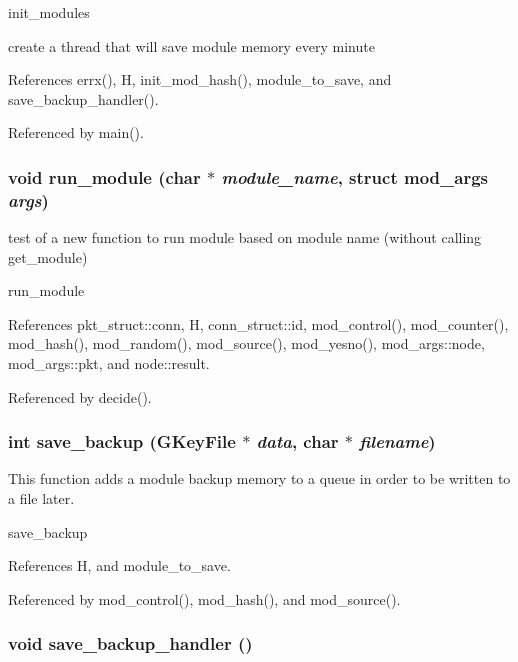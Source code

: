 init\_\-modules 

create a thread that will save module memory every minute 

References errx(), H, init\_\-mod\_\-hash(), module\_\-to\_\-save, and save\_\-backup\_\-handler().

Referenced by main().
\subsubsection[{run\_\-module}]{\setlength{\rightskip}{0pt plus 5cm}void run\_\-module (char $\ast$ {\em module\_\-name}, \/  struct {\bf mod\_\-args} {\em args})}\label{modules_8c_6df156759566c2d091ef852a17e2fa78}


test of a new function to run module based on module name (without calling get\_\-module) 

run\_\-module 

References pkt\_\-struct::conn, H, conn\_\-struct::id, mod\_\-control(), mod\_\-counter(), mod\_\-hash(), mod\_\-random(), mod\_\-source(), mod\_\-yesno(), mod\_\-args::node, mod\_\-args::pkt, and node::result.

Referenced by decide().
\subsubsection[{save\_\-backup}]{\setlength{\rightskip}{0pt plus 5cm}int save\_\-backup (GKeyFile $\ast$ {\em data}, \/  char $\ast$ {\em filename})}\label{modules_8c_6a6a789efa2db64ed2bbe9b223efb1b1}


This function adds a module backup memory to a queue in order to be written to a file later. 

save\_\-backup 

References H, and module\_\-to\_\-save.

Referenced by mod\_\-control(), mod\_\-hash(), and mod\_\-source().
\subsubsection[{save\_\-backup\_\-handler}]{\setlength{\rightskip}{0pt plus 5cm}void save\_\-backup\_\-handler ()}\label{modules_8c_3f39ac5d36f425de26ef1076cf613315}


